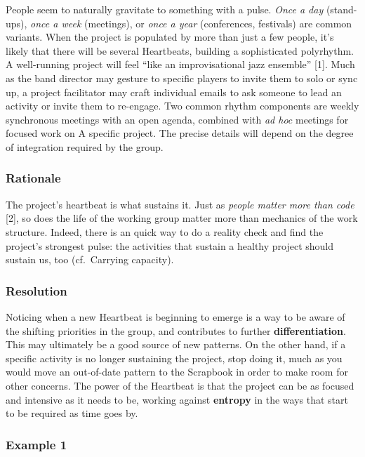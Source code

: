 People seem to naturally gravitate to something with a pulse. \emph{Once
a day} (stand-ups), \emph{once a week} (meetings), or \emph{once a year}
(conferences, festivals) are common variants. When the project is
populated by more than just a few people, it's likely that there will be
several {{Heartbeats}}, building a sophisticated polyrhythm. A
well-running project will feel ``like an improvisational jazz ensemble''
{{[}1{]}}. Much as the band director may gesture to specific players to
invite them to solo or sync up, a project facilitator may craft
individual emails to ask someone to lead an activity or invite them to
re-engage. Two common rhythm components are weekly synchronous meetings
with an open agenda, combined with \emph{ad hoc} meetings for focused
work on {{A specific project}}. The precise details will depend on the
degree of integration required by the group.

\hypertarget{rationale}{%
\subsubsection{Rationale}\label{rationale}}

The project's heartbeat is what sustains it. Just as \emph{people matter
more than code} {{[}2{]}}, so does the life of the working group matter
more than mechanics of the work structure. Indeed, there is an quick way
to do a reality check and find the project's strongest pulse: the
activities that sustain a healthy project should sustain us, too
(cf.~{{Carrying capacity}}).

\hypertarget{resolution}{%
\subsubsection{Resolution}\label{resolution}}

Noticing when a new {{Heartbeat}} is beginning to emerge is a way to be
aware of the shifting priorities in the group, and contributes to
further \textbf{differentiation}. This may ultimately be a good source
of new patterns. On the other hand, if a specific activity is no longer
sustaining the project, stop doing it, much as you would move an
out-of-date pattern to the {{Scrapbook}} in order to make room for other
concerns. The power of the {{Heartbeat}} is that the project can be as
focused and intensive as it needs to be, working against
\textbf{entropy} in the ways that start to be required as time goes by.

\hypertarget{example-1}{%
\subsubsection{Example 1}\label{example-1}}


